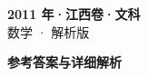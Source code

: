 \documentclass[zihao=-4, a4paper]{ctexart}
\begin{document}
\begin{center}
  {\Large\bfseries 2011 年·江西卷·文科}\\[4pt]
  {\large 数学 · 解析版}
\end{center}
\medskip
{}

\clearpage
{}
\begin{center}{\Large\bfseries 参考答案与详细解析}\end{center}
\medskip

\end{document}
